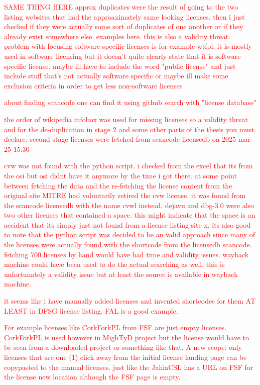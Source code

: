 \textcolor{red}{SAME THING HERE approx duplicates were the result of going to the two listing websites that had the approaximately same looking licenses. then i just checked if they were actually some sort of duplicates of one another or if they already exist somewhere else. examples here. this is also a validity threat. problem with focusing software specific licenses is for example wtfpl. it is mostly used in software licensing but it doesn't quite clearly state that it is software specific license. maybe ill have to include the word "public license" and just include stuff that's not actually software specific or maybe ill make some exclusion criteria in order to get less non-software licenses}

\textcolor{red}{about finding scancode one can find it using github search with "license database"}

\textcolor{red}{the order of wikipedia infobox was used for missing licenses so a validity threat and for the de-duplication in stage 2 and some other parts of the thesis you must declare. second stage licenses were fetched from scancode licensedb on 2025 mar 25 15:30}

\textcolor{red}{cvw was not found with the python script. i checked from the excel that its from the osi but osi didnt have it anymore by the time i got there. at some point between fetching the data and the re-fetching the license content from the original site MITRE had voluntarily retired the cvw license. it was found from the scancode licensedb with the name cvwl instead. dejavu and dbg-3.0 were also two other licenses that contained a space. this might indicate that the space is an accident that its simply just not found from a license listing site x. its also good to note that the python script was decided to be an valid approach since many of the licenses were actually found with the shortcode from the licensedb scancode. fetching 700 licenses by hand would have had time and validity issues. wayback machine could have been used to do the actual searching as well. this is unfortunately a validity issue but at least the source is available in wayback machine.}

\textcolor{red}{it seems like i have manually added licenses and invented shortcodes for them AT LEAST in DFSG license listing. FAL is a good example.}

\textcolor{red}{For example licenses like CorkForkPL from FSF are just empty licenses. CorkForkPL is used however in MighTyD project but the license would have to be seen from a downloaded project or something like that. A new scope: only licenses that are one (1) click away from the initial license landing page can be copypasted to the manual licenses. just like the JahiaCSL has a URL on FSF for the license new location although the FSF page is empty.}

